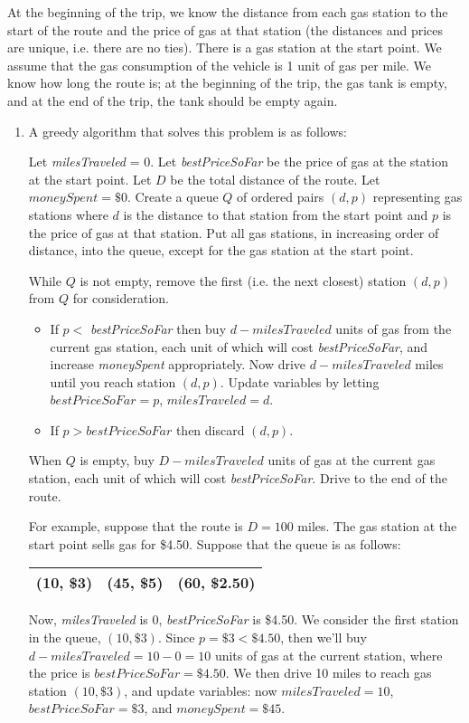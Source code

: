 \documentclass[11pt]{article}
\begin{document}
At the beginning of the trip, we know the distance from each gas station to the start of the route and the price of gas at that station (the distances and prices are unique, i.e. there are no ties). There is a gas station at the start point. We assume that the gas consumption of the vehicle is 1 unit of gas per mile. We know how long the route is; at the beginning of the trip, the gas tank is empty, and at the end of the trip, the tank should be empty again.

\begin{enumerate}

\item A greedy algorithm that solves this problem is as follows:

Let \textit{milesTraveled} = 0. Let \textit{bestPriceSoFar} be the price of gas at the station at the start point. Let $D$ be the total distance of the route. Let $\textit{moneySpent} = \$0$. Create a queue $Q$ of ordered pairs $(d, p)$ representing gas stations where $d$ is the distance to that station from the start point and $p$ is the price of gas at that station. Put all gas stations, in increasing order of distance, into the queue, except for the gas station at the start point. 

While $Q$ is not empty, remove the first (i.e. the next closest) station $(d, p)$ from $Q$ for consideration. 
\begin{itemize}
\item[\empty] If $p <$ \textit{bestPriceSoFar} then buy $d -\textit{milesTraveled}$ units of gas from the current gas station, each unit of which will cost \textit{bestPriceSoFar}, and increase \textit{moneySpent} appropriately. Now drive $d -\textit{milesTraveled}$ miles until you reach station $(d, p)$. Update variables by letting $\textit{bestPriceSoFar}=p$, $\textit{milesTraveled} = d$. 
\item[\empty] If $p > \textit{bestPriceSoFar}$ then discard $(d, p)$. 
\end{itemize}
When $Q$ is empty, buy $D-\textit{milesTraveled}$ units of gas at the current gas station, each unit of which will cost \textit{bestPriceSoFar}. Drive to the end of the route. 

For example, suppose that the route is $D=100$ miles. The gas station at the start point sells gas for \$4.50. Suppose that the queue is as follows:
\begin{center}
\begin{tabular}{|c|c|c|}
\hline
(10, \$3) & (45, \$5)& (60, \$2.50)\\
\hline
\end{tabular}
\end{center}
Now, \textit{milesTraveled} is 0, \textit{bestPriceSoFar} is \$4.50. We consider the first station in the queue, $(10, \$3)$. Since $p = \$3 < \$4.50$, then we'll buy $d-\textit{milesTraveled} = 10-0 = 10$ units of gas at the current station, where the price is $\textit{bestPriceSoFar} = \$4.50$. We then drive 10 miles to reach gas station $(10, \$3)$, and update variables: now $\textit{milesTraveled}=10$, $\textit{bestPriceSoFar}=\$3$, and $\textit{moneySpent} = \$45$. 


\end{enumerate}
\end{document}

